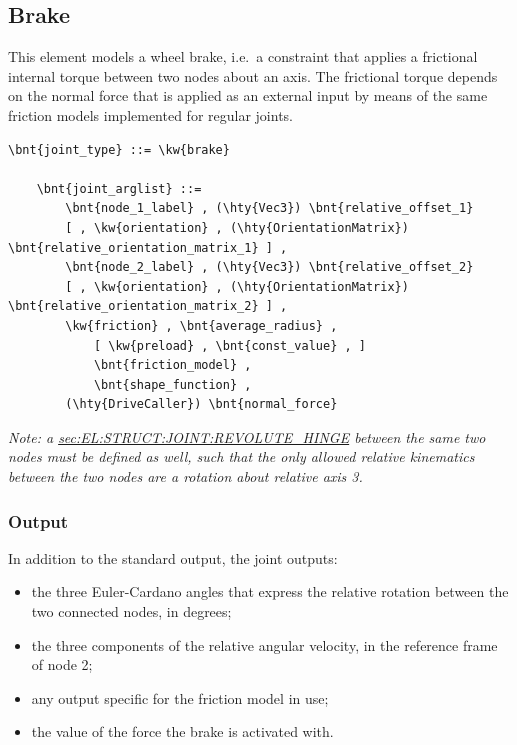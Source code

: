 \subsection{Brake}
This element models a wheel brake, i.e.\ a constraint that applies
a frictional internal torque between two nodes about an axis.
The frictional torque depends on the normal force that is applied 
as an external input by means of the same friction models implemented
for regular joints.
\begin{Verbatim}[commandchars=\\\{\}]
    \bnt{joint_type} ::= \kw{brake}

    \bnt{joint_arglist} ::= 
        \bnt{node_1_label} , (\hty{Vec3}) \bnt{relative_offset_1} 
        [ , \kw{orientation} , (\hty{OrientationMatrix}) \bnt{relative_orientation_matrix_1} ] ,
        \bnt{node_2_label} , (\hty{Vec3}) \bnt{relative_offset_2}
        [ , \kw{orientation} , (\hty{OrientationMatrix}) \bnt{relative_orientation_matrix_2} ] ,
        \kw{friction} , \bnt{average_radius} , 
            [ \kw{preload} , \bnt{const_value} , ]
            \bnt{friction_model} , 
            \bnt{shape_function} ,
        (\hty{DriveCaller}) \bnt{normal_force}
\end{Verbatim}
\emph{Note: a
\hyperref{\kw{revolute hinge}}{\kw{revolute hinge} (see Section~}{)}{sec:EL:STRUCT:JOINT:REVOLUTE_HINGE}
between the same two nodes must be defined as well, such that
the only allowed relative kinematics between the two nodes are
a rotation about relative axis 3.
}

\subsubsection{Output}
In addition to the standard output, the  joint outputs:
\begin{itemize}
\item the three Euler-Cardano angles that express the relative rotation
	between the two connected nodes, in degrees;
\item the three components of the relative angular velocity,
	in the reference frame of node 2;
\item any output specific for the friction model in use;
\item the value of the force the brake is activated with.
\end{itemize}

